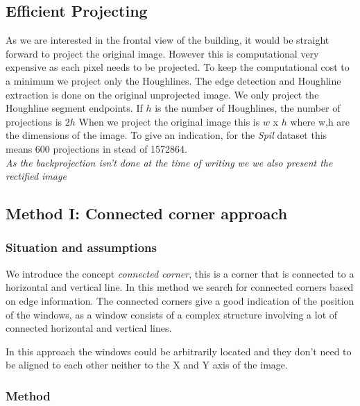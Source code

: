 

\subsection{Efficient Projecting} 
As we are interested in the frontal view of the building, it would be straight
forward to project the original image. However this is computational
very expensive as each pixel needs to be projected. To keep the computational cost to a minimum we project only the
Houghlines. The edge detection and Houghline extraction is done on the original
unprojected image. We only project the Houghline segment
endpoints. If $h$ is the number of Houghlines, the number of projections is $2h$
When we project the original image this is $w$ x $h$ where w,h are the dimensions of
the image. To give an indication, for the \emph{Spil} dataset %
this means 600 projections in stead of 1572864.\\
\emph{As the backprojection isn't done at the time of writing we 
we also present the rectified image}


\subsection{Method I: Connected corner approach} 

\subsubsection{Situation and assumptions}
We introduce the concept \emph{connected corner}, this is a corner that is 
connected to a horizontal and vertical line.  
In this method we search for connected corners based on edge information.
The connected corners give a good indication of the position of the windows, as 
a window consists of a complex structure involving a lot of connected horizontal
and vertical lines. 

In this approach the windows could be arbitrarily located and they don't need
to be aligned to each other neither to the X and Y axis of the image.

\subsubsection{Method}
